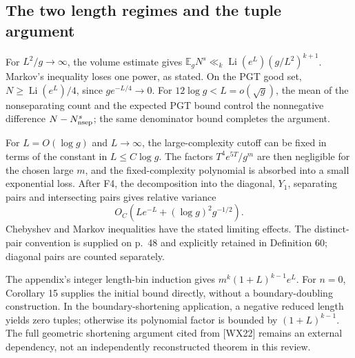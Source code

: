 \documentclass[10pt]{article}
\begin{document}
\subsection*{The two length regimes and the tuple argument}
For \(L^2/g\to\infty\), the volume estimate gives \(\mathbb E_gN^s\ll_k\operatorname{Li}(e^L)(g/L^2)^{k+1}\). Markov’s inequality loses one power, as stated. On the PGT good set, \(N\ge\operatorname{Li}(e^L)/4\), since \(ge^{-L/4}\to0\). For \(12\log g<L=o(\sqrt g)\), the mean of the nonseparating count and the expected PGT bound control the nonnegative difference \(N-N_{\rm nsep}^s\); the same denominator bound completes the argument.\par
For \(L=O(\log g)\) and \(L\to\infty\), the large-complexity cutoff can be fixed in terms of the constant in \(L\le C\log g\). The factors \(T^4e^{5T}/g^m\) are then negligible for the chosen large \(m\), and the fixed-complexity polynomial is absorbed into a small exponential loss. After F4, the decomposition into the diagonal, \(Y_1\), separating pairs and intersecting pairs gives relative variance \[O_C\!\left(Le^{-L}+(\log g)^2g^{-1/2}\right).\] Chebyshev and Markov inequalities have the stated limiting effects. The distinct-pair convention is supplied on p. 48 and explicitly retained in Definition 60; diagonal pairs are counted separately.\par
The appendix’s integer length-bin induction gives \(m^k(1+L)^{k-1}e^L\). For \(n=0\), Corollary 15 supplies the initial bound directly, without a boundary-doubling construction. In the boundary-shortening application, a negative reduced length yields zero tuples; otherwise its polynomial factor is bounded by \((1+L)^{k-1}\). The full geometric shortening argument cited from [WX22] remains an external dependency, not an independently reconstructed theorem in this review.\par
\end{document}
